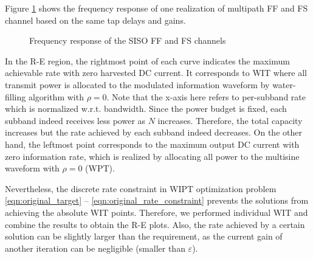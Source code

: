 Figure \ref{fig:siso-channels} shows the frequency response of one realization of multipath FF and FS channel based on the same tap delays and gains.

\begin{figure}
  \centering
  \caption{Frequency response of the SISO FF and FS channels}\label{fig:siso-channels}
\end{figure}

In the R-E region, the rightmost point of each curve indicates the maximum achievable rate with zero harvested DC current. It corresponds to WIT where all transmit power is allocated to the modulated information waveform by water-filling algorithm with $\rho  = 0$. Note that the x-axis here refers to per-subband rate which is normalized w.r.t. bandwidth. Since the power budget is fixed, each subband indeed receives less power as $N$ increases. Therefore, the total capacity increases but the rate achieved by each subband indeed decreases. On the other hand, the leftmost point corresponds to the maximum output DC current with zero information rate, which is realized by allocating all power to the multisine waveform with $\rho  = 0$ (WPT). 

Nevertheless, the discrete rate constraint in WIPT optimization problem \ref{eqn:original_target} -- \ref{eqn:original_rate_constraint} prevents the solutions from achieving the absolute WIT points. Therefore, we performed individual WIT and combine the results to obtain the R-E plots. Also, the rate achieved by a certain solution can be slightly larger than the requirement, as the current gain of another iteration can be negligible (smaller than $\varepsilon$). 